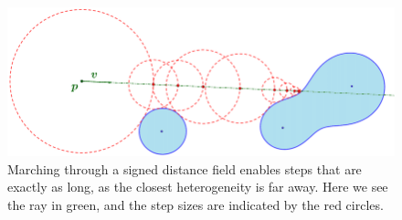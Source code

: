 \begin{figure}
    \centering
    \includegraphics[width=0.9\linewidth]{figures/sdf_ray_marching.png}
    \caption{Marching through a signed distance field enables steps that are exactly as long, as the closest heterogeneity is far away. Here we see the ray in green, and the step sizes are indicated by the red circles. \cite{SDF_sphere_marching}}
    \label{fig:SDF_marching}
\end{figure}

